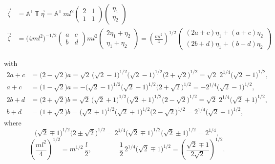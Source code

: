 \documentclass[11pt]{article}
\newcommand{\Tm}{\mathbb{T}}
\newcommand{\Am}{\mathbb{A}}
\begin{document}
\begin{align*}
  \vec\zeta &= \Am^{\mathsf T}\,\Tm\,\vec\eta
    = \Am^{\mathsf T}\, ml^2 \begin{pmatrix}2 & 1\\ 1 & 1\end{pmatrix}
      \begin{pmatrix}\eta_1\\ \eta_2\end{pmatrix}\\[4pt]
  \vec\zeta &= \bigl(4ml^2\bigr)^{-1/2}\begin{pmatrix}a & c\\ b & d\end{pmatrix}
     ml^2 \begin{pmatrix}2\eta_1 + \eta_2\\ \eta_1 + \eta_2\end{pmatrix}
   = \left(\frac{ml^2}{4}\right)^{1/2}
     \begin{pmatrix}(2a+c)\eta_1 + (a+c)\eta_2\\[4pt] (2b+d)\eta_1 + (b+d)\eta_2\end{pmatrix}
\end{align*}

\noindent with
\begin{align*}
  2a+c &= \bigl(2-\sqrt2\bigr) a
        = \sqrt2\,\bigl(\sqrt2-1\bigr)^{1/2}\bigl(\sqrt2-1\bigr)^{1/2}\bigl(2+\sqrt2\bigr)^{1/2}
        = \sqrt2\;2^{1/4}\bigl(\sqrt2-1\bigr)^{1/2},\\
  a+c  &= \bigl(1-\sqrt2\bigr) a
        = -\bigl(\sqrt2-1\bigr)^{1/2}\bigl(\sqrt2-1\bigr)^{1/2}\bigl(2+\sqrt2\bigr)^{1/2}
        = -2^{1/4}\bigl(\sqrt2-1\bigr)^{1/2},\\
  2b+d &= \bigl(2+\sqrt2\bigr) b
        = \sqrt2\,\bigl(\sqrt2+1\bigr)^{1/2}\bigl(\sqrt2+1\bigr)^{1/2}\bigl(2-\sqrt2\bigr)^{1/2}
        = \sqrt2\;2^{1/4}\bigl(\sqrt2+1\bigr)^{1/2},\\
  b+d  &= \bigl(1+\sqrt2\bigr) b
        = \bigl(\sqrt2+1\bigr)^{1/2}\bigl(\sqrt2+1\bigr)^{1/2}\bigl(2-\sqrt2\bigr)^{1/2}
        = 2^{1/4}\bigl(\sqrt2+1\bigr)^{1/2},
\end{align*}
where
\begin{equation*}
  \bigl(\sqrt2\mp1\bigr)^{1/2}\bigl(2\pm\sqrt2\bigr)^{1/2}
    = 2^{1/4}\bigl(\sqrt2\mp1\bigr)^{1/2}\bigl(\sqrt2\pm1\bigr)^{1/2} = 2^{1/4},
\end{equation*}
\begin{equation*}
  \left(\frac{ml^2}{4}\right)^{1/2} = m^{1/2}\,\frac{l}{2},
  \qquad\qquad
  \frac{1}{2}\,2^{1/4}\bigl(\sqrt2\mp1\bigr)^{1/2}
    = \left(\frac{\sqrt2\mp1}{2\sqrt2}\right)^{1/2}.
\end{equation*}
\end{document}
